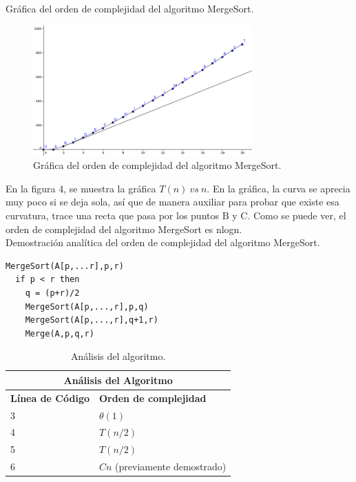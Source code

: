 \documentclass[12pt]{report}
\begin{document}
Gráfica del orden de complejidad del algoritmo MergeSort.\\
\begin{figure}[H]
	\includegraphics[height=5cm]{imagenes/output2_grafica.png}
	\centering
	\caption{Gráfica del orden de complejidad del algoritmo MergeSort.}
	\centering
\end{figure}
En la figura 4, se muestra la gráfica $T(n) \ vs \ n$. En la gráfica, la curva se aprecia muy poco si se deja sola, así que de manera auxiliar para probar que existe esa curvatura, trace una recta que pasa por los puntos B y C.
Como se puede ver, el orden de complejidad del algoritmo MergeSort es nlogn.\\

Demostración analítica del orden de complejidad del algoritmo MergeSort.\\

\lstset{language=C, breaklines=true, basicstyle=\footnotesize}
\lstset{numbers=left, numberstyle=\tiny, stepnumber=1, numbersep=10pt}
\begin{lstlisting}
MergeSort(A[p,...r],p,r)
  if p < r then
    q = (p+r)/2
    MergeSort(A[p,...,r],p,q)
    MergeSort(A[p,...,r],q+1,r)
    Merge(A,p,q,r)

\end{lstlisting}
\newpage
\begin{table}[htbp]
	\begin{center}
		\begin{tabular}{|l|l|}
			\hline
			\multicolumn{2}{|c|}{Análisis del Algoritmo} \\ 
			\hline
			\textbf{Línea de Código} & \textbf{Orden de complejidad}\\
			\hline
			3 & $\theta (1)$ \\ \hline
			4 & $T(n/2)$ \\ \hline
			5 & $T(n/2)$ \\ \hline
			6 & $Cn$ (previamente demostrado) \\ \hline
		\end{tabular}
		\caption{Análisis del algoritmo.}
		\label{tabla:analisis2}
	\end{center}
\end{table}
\end{document}
